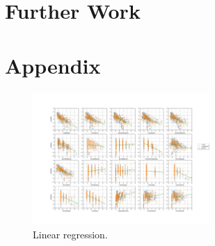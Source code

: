 \section{Further Work}


\section*{Appendix}

\begin{figure}[htbp!]
  \centerline{\includegraphics[width=0.6\textwidth]{../../code/hw2/figures/2-linear-regression.pdf}}
  \caption{Linear regression.}
  \label{fig:2-linear-regression}
\end{figure}

